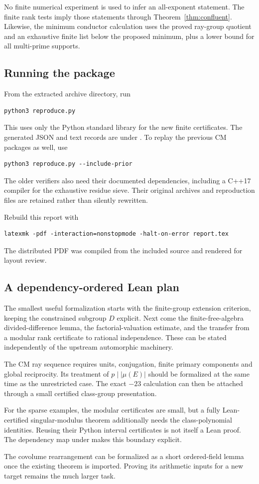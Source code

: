 No finite numerical experiment is used to infer an all-exponent statement. The finite rank tests imply those statements through Theorem~\ref{thm:confluent}. Likewise, the minimum conductor calculation uses the proved ray-group quotient and an exhaustive finite list below the proposed minimum, plus a lower bound for all multi-prime supports.

\subsection{Running the package}

From the extracted archive directory, run
\begin{verbatim}
python3 reproduce.py
\end{verbatim}
This uses only the Python standard library for the new finite certificates. The generated JSON and text records are under . To replay the previous CM packages as well, use
\begin{verbatim}
python3 reproduce.py --include-prior
\end{verbatim}
The older verifiers also need their documented dependencies, including a C++17 compiler for the exhaustive residue sieve. Their original archives and reproduction files are retained rather than silently rewritten.

Rebuild this report with
\begin{verbatim}
latexmk -pdf -interaction=nonstopmode -halt-on-error report.tex
\end{verbatim}
The distributed PDF was compiled from the included source and rendered for layout review.

\subsection{A dependency-ordered Lean plan}

The smallest useful formalization starts with the finite-group extension criterion, keeping the constrained subgroup $D$ explicit. Next come the finite-free-algebra divided-difference lemma, the factorial-valuation estimate, and the transfer from a modular rank certificate to rational independence. These can be stated independently of the upstream automorphic machinery.

The CM ray sequence requires units, conjugation, finite primary components and global reciprocity. Its treatment of $p\mid|\mu(E)|$ should be formalized at the same time as the unrestricted case. The exact $-23$ calculation can then be attached through a small certified class-group presentation.

For the sparse examples, the modular certificates are small, but a fully Lean-certified singular-modulus theorem additionally needs the class-polynomial identities. Reusing their Python interval certificates is not itself a Lean proof. The dependency map under  makes this boundary explicit.

The covolume rearrangement can be formalized as a short ordered-field lemma once the existing theorem is imported. Proving its arithmetic inputs for a new target remains the much larger task.
